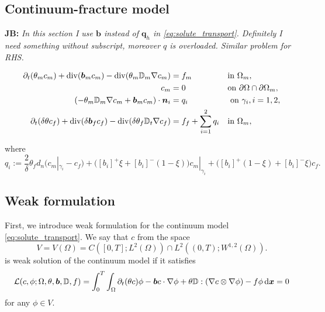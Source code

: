 \documentclass[a4paper]{article}
\def\prtl{\partial}
\def\vc#1{\mathbf{\boldsymbol{#1}}}     %
\def\tn#1{{\mathbb{#1}}}    %
\def\div{{\rm div}}
\def\grad{\nabla}
\def\d {\,{\rm d}}
\newcommand{\note}[2]{{\color{blue} \textbf{ #1:} \textit{#2}}}
\begin{document}
\subsection{Continuum-fracture model}
\note{JB}{In this section I use $\vc b$ instead of $\vc q_h$ in \eqref{eq:solute_transport}. Definitely I need something without subscript, moreover $q$ is overloaded.
Similar problem for RHS.}

\begin{subequations}
 
\label{eq:fr:solute}
\begin{align}
  \label{eq:fr:solute:main}
  \prtl_t (\theta_m c_m) + \div(\vc b_m c_m) - \div(\theta_m \tn D_m \grad c_m) &= f_m&&  \text{in } \Omega_m,\\
  \label{eq:fr:solute:bc}
  c_m &= 0&& \text{on } \partial\Omega\cap\partial\Omega_m,\\
  (- \theta_m \tn D_m\grad c_m + \vc b_m c_m) \cdot \vc n_i &= q_i &&\mbox{ on }\gamma_i,i=1,2,\\ 
  \prtl_t(\delta\theta c_f)  + \div(\delta \vc b_f c_f ) - \div( \delta \theta_f \tn D_t \grad c_f) 
      &= f_f + \sum_{i=1}^2 q_i&&  \text{in } \Omega_m,\\
\end{align}
\end{subequations}

where 
\begin{equation}
    \label{eq:fr:flux12}
    q_i:=\frac2\delta \theta_f d_n(c_m|_{\gamma_i} - c_f) 
    +  \big([b_i]^{+}\xi + [b_i]^{-}(1-\xi)\big) c_m|_{\gamma_i}
    +  \big([b_i]^{+}(1-\xi) + [b_i]^{-}\xi\big) c_f.
\end{equation}

\subsection{Weak formulation}
First, we introduce weak formulation for the continuum model \eqref{eq:solute_transport}.
We say that $c$ from the space 
\[
    V= V(\Omega) =C([0,T]; L^2(\Omega) ) \cap L^2( (0,T); W^{1,2}(\Omega) ).
\]    
is weak solution of the continuum model if it satisfies
\begin{equation}
    \label{eq:solute_weak}
    \mathcal L (c, \phi; \Omega, \theta, \vc b, \tn D, f) = \int_0^T \int_{\Omega} \prtl_t(\theta c)\phi - \vc b c \cdot \grad \phi 
        + \theta \tn D : (\grad c \otimes \grad \phi) - f\phi \d \vc x =0\\
\end{equation}
for any $\phi \in V$. 
\end{document}
